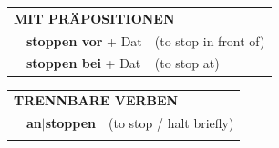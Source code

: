 \documentclass[10pt,a4paper]{revtex4-2}
\begin{document}
\begin{verbbox}
   \vspace{10pt}

   \begin{tabular}{lll}
      \multicolumn{3}{l}{\textbf{MIT PRÄPOSITIONEN}}\\
& \textbf{stoppen vor} + Dat & (to stop in front of)\\
& \textbf{stoppen bei} + Dat & (to stop at)\\
\end{tabular}
  \hfill
   \begin{tabular}{lll}
      \multicolumn{3}{l}{\textbf{TRENNBARE VERBEN}}\\
 & \textbf{an$|$stoppen} & (to stop / halt briefly)\\
\vspace{10pt}
  \end{tabular}

  \vspace{-5pt}

\end{verbbox}
\end{document}
